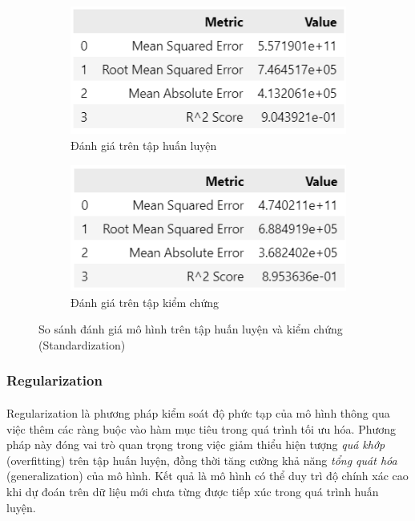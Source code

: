 \begin{figure}[H]
    \centering
    \begin{subfigure}[b]{0.48\textwidth}
        \centering
        \includegraphics[width=\linewidth]{img_multiple/metrics_standard_train.png}
        \caption{Đánh giá trên tập huấn luyện}
    \end{subfigure}
    \hfill
    \begin{subfigure}[b]{0.48\textwidth}
        \centering
        \includegraphics[width=\linewidth]{img_multiple/metrics_standard_val.png}
        \caption{Đánh giá trên tập kiểm chứng}
    \end{subfigure}
    \caption{So sánh đánh giá mô hình trên tập huấn luyện và kiểm chứng (Standardization)} 
\end{figure}

\subsubsection{Regularization}
\paragraph{}{Regularization là phương pháp kiểm soát độ phức tạp của mô hình thông qua việc thêm các ràng buộc vào hàm mục tiêu trong quá trình tối ưu hóa. Phương pháp này đóng vai trò quan trọng trong việc giảm thiểu hiện tượng \textit{quá khớp} (overfitting) trên tập huấn luyện, đồng thời tăng cường khả năng \textit{tổng quát hóa} (generalization) của mô hình. Kết quả là mô hình có thể duy trì độ chính xác cao khi dự đoán trên dữ liệu mới chưa từng được tiếp xúc trong quá trình huấn luyện.}

